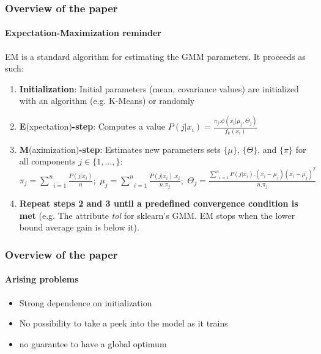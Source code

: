 \documentclass[aspectratio=43]{beamer}
\begin{document}
\begin{frame}
    \frametitle{Overview of the paper}
    \framesubtitle{Expectation-Maximization reminder}
    EM is a standard algorithm for estimating the GMM parameters. It proceeds as such:
    \begin{small}\begin{enumerate}
      \item \textbf{Initialization}: Initial parameters (mean, covariance values) are initialized with an algorithm (e.g. K-Means) or randomly
      \item \textbf{E}(xpectation)\textbf{-step}: Computes a value $P(j|x_i)=\frac{\pi_j.\phi(x_i|\mu_j,\Theta_j)}{f_k(x_i)}$
      \item \textbf{M}(aximization)\textbf{-step}: Estimates new parameters sets $\{\mu\}$, $\{\Theta\}$, and $\{\pi\}$ for all components $j\in \{1,...,\}$:\linebreak
          $\pi_j=\underset{i=1}{\overset{n}{\sum}}\frac{P(j|x_i)}{n};\,\, \mu_j=\underset{i=1}{\overset{n}{\sum}}\frac{P(j|x_i).x_i}{n.\pi_j};\,\, \Theta_j=\frac{\underset{i=1}{\overset{n}{\sum}}P(j|x_i).(x_i-\mu_j)(x_i-\mu_j)^T}{n.\pi_j}$
      \item \textbf{Repeat steps 2 and 3 until a predefined convergence condition is met}  (e.g. The attribute \textit{tol} for sklearn's GMM. EM stops when the lower bound average gain is below it).
    \end{enumerate}\end{small}
\end{frame}

\begin{frame}
    \frametitle{Overview of the paper}
    \framesubtitle{Arising problems}
    \begin{itemize}
      \item Strong dependence on initialization\newline
      \item No possibility to take a peek into the model as it trains\newline
      \item no guarantee to have a global optimum
    \end{itemize}
\end{frame}
\end{document}
